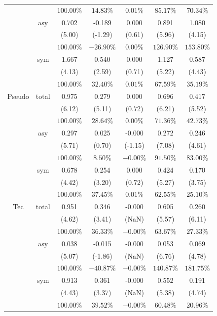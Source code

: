 \documentclass[
]{article}
\begin{document}
\begin{table}[H]
{\begin{tabular}{ccccccc}
   &  & $100.00\%$ & $14.83\%$ & $0.01\%$ & $85.17\%$ & $70.34\%$ \\ 
   & asy & 0.702 & -0.189 & 0.000 & 0.891 & 1.080 \\ 
   &  & (5.00) & (-1.29) & (0.61) & (5.96) & (4.15) \\ 
   &  & $100.00\%$ & $-26.90\%$ & $0.00\%$ & $126.90\%$ & $153.80\%$ \\ 
   & sym & 1.667 & 0.540 & 0.000 & 1.127 & 0.587 \\ 
   &  & (4.13) & (2.59) & (0.71) & (5.22) & (4.43) \\ 
   &  & $100.00\%$ & $32.40\%$ & $0.01\%$ & $67.59\%$ & $35.19\%$ \\ 
   \hline 
Pseudo & total & 0.975 & 0.279 & 0.000 & 0.696 & 0.417 \\ 
   &  & (6.12) & (5.11) & (0.72) & (6.21) & (5.52) \\ 
   &  & $100.00\%$ & $28.64\%$ & $0.00\%$ & $71.36\%$ & $42.73\%$ \\ 
   & asy & 0.297 & 0.025 & -0.000 & 0.272 & 0.246 \\ 
   &  & (5.71) & (0.70) & (-1.15) & (7.08) & (4.61) \\ 
   &  & $100.00\%$ & $8.50\%$ & $-0.00\%$ & $91.50\%$ & $83.00\%$ \\ 
   & sym & 0.678 & 0.254 & 0.000 & 0.424 & 0.170 \\ 
   &  & (4.42) & (3.20) & (0.72) & (5.27) & (3.75) \\ 
   &  & $100.00\%$ & $37.45\%$ & $0.01\%$ & $62.55\%$ & $25.10\%$ \\ 
   \hline 
Tec & total & 0.951 & 0.346 & -0.000 & 0.605 & 0.260 \\ 
   &  & (4.62) & (3.41) & (NaN) & (5.57) & (6.11) \\ 
   &  & $100.00\%$ & $36.33\%$ & $-0.00\%$ & $63.67\%$ & $27.33\%$ \\ 
   & asy & 0.038 & -0.015 & -0.000 & 0.053 & 0.069 \\ 
   &  & (5.07) & (-1.86) & (NaN) & (6.76) & (4.78) \\ 
   &  & $100.00\%$ & $-40.87\%$ & $-0.00\%$ & $140.87\%$ & $181.75\%$ \\ 
   & sym & 0.913 & 0.361 & -0.000 & 0.552 & 0.191 \\ 
   &  & (4.43) & (3.37) & (NaN) & (5.38) & (4.74) \\ 
   &  & $100.00\%$ & $39.52\%$ & $-0.00\%$ & $60.48\%$ & $20.96\%$ \\ 
   \hline 
\end{tabular}
}
\end{table}
\newpage
\end{document}

